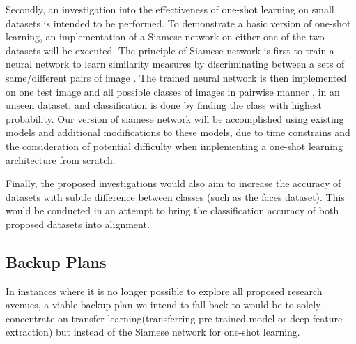 \documentclass{article}
\begin{document}
Secondly, an investigation into the effectiveness of one-shot learning on small datasets is intended to be performed. To demonstrate a basic version of one-shot learning, an implementation of a Siamese network \cite{bromley1994signature} on either one of the two datasets will be executed. The principle of Siamese network is first to train a neural network to learn similarity measures by discriminating between a sets of same/different pairs of image \cite{Koch}. The trained neural network is then implemented on one test image and all possible classes of images in pairwise manner , in an unseen dataset, and classification is done by finding the class with highest probability.   Our version of siamese network will be accomplished using existing models and additional modifications to these models, due to time constrains and the consideration of potential difficulty when implementing a one-shot learning architecture from scratch.

Finally, the proposed investigations would also aim to increase the accuracy of datasets with subtle difference between classes (such as the faces dataset). This would be conducted in an attempt to bring the classification accuracy of both proposed datasets into alignment.

\subsection{Backup Plans}
\label{sec:plans}

In instances where it is no longer possible to explore all proposed research avenues, a viable backup plan we intend to fall back to would be to solely concentrate on transfer learning(transferring pre-trained model or deep-feature extraction) but instead of the Siamese network for one-shot learning. 



\end{document}
